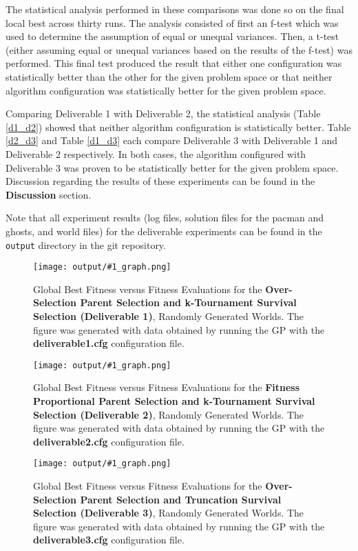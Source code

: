 \documentclass[11pt]{article}
\newcommand{\fitnessplotcaption}[2]{\caption{Global Best Fitness versus Fitness Evaluations for the \textbf{{#1}}, Randomly Generated Worlds. The figure was generated with data obtained by running the GP with the \textbf{{#2}} configuration file.}}
\newcommand{\addgraphic}[1]{\centerline{\texttt{[image: output/\#1\_graph.png]}}}
\begin{document}
The statistical analysis performed in these comparisons was done so on the final local best across thirty runs. The analysis consisted 
of first an f-test which was used to determine the assumption of equal or unequal variances. Then, a t-test (either assuming equal or unequal
variances based on the results of the f-test) was performed. This final test produced the result that either one configuration was
statistically better than the other for the given problem space or that neither algorithm configuration was statistically better 
for the given problem space.

Comparing Deliverable 1 with Deliverable 2, the statistical analysis (Table \ref{d1_d2}) showed that neither algorithm 
configuration is statistically better. Table \ref{d2_d3} and Table \ref{d1_d3} each compare Deliverable 3 with Deliverable 1 
and Deliverable 2 respectively. In both cases, the
algorithm configured with Deliverable 3 was proven to be statistically better for the given problem space. 
Discussion regarding the results of these experiments can be found in the \textbf{Discussion} section.

Note that all experiment results (log files, solution files for the pacman and ghosts, and world files) for the deliverable experiments can be
found in the \texttt{output} directory in the git repository.

\begin{figure}[H]
    \addgraphic{deliverable1}
    \fitnessplotcaption{Over-Selection Parent Selection and k-Tournament Survival Selection (Deliverable 1)}{deliverable1.cfg}
    \label{fig:deliverable1}
\end{figure}

\begin{figure}[H]
    \addgraphic{deliverable2}
    \fitnessplotcaption{Fitness Proportional Parent Selection and k-Tournament Survival Selection (Deliverable 2)}{deliverable2.cfg}
    \label{fig:deliverable2}
\end{figure}

\begin{figure}[H]
    \addgraphic{deliverable3}
    \fitnessplotcaption{Over-Selection Parent Selection and Truncation Survival Selection (Deliverable 3)}{deliverable3.cfg}
    \label{fig:deliverable3}
\end{figure}
\end{document}
